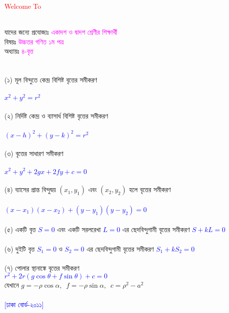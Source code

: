 \documentclass{article}
\begin{document}
 
	\Large
	\textcolor{red}{Welcome To} 
	\\
	\\
	যাদের জন্যে প্রযোজ্যঃ  	\textcolor{magenta}{একাদশ ও দ্বাদশ শ্রেণীর শিক্ষার্থী} \\
	বিষয়ঃ \textcolor{magenta}{উচ্চতর গণিত ১ম পত্র} \\
	অধ্যায়ঃ \textcolor{magenta}{৪-বৃত্ত}\\ 
	\\
	\\
	(১)  মূল বিন্দুতে কেন্দ্র বিশিষ্ট বৃত্তের সমীকরণ  \\
	\\
	\textcolor{blue}{$x^2+y^2=r^2$}\\
	\\
	(২) নির্দিষ্ট কেন্দ্র ও ব্যাসার্ধ বিশিষ্ট বৃত্তের  সমীকরণ \\
	\\
	\textcolor{blue}{$(x-h)^2+(y-k)^2=r^2$}\\
	\\
	(৩) বৃত্তের সাধারণ সমীকরণ\\
	\\  
	\textcolor{blue}{$x^2+y^2+2gx+2fy+c=0$}\\
	\\
	(৪) ব্যাসের প্রান্ত বিন্দুদ্বয় $(x_1,y_1)$ এবং $(x_2,y_2)$ হলে বৃত্তের সমীকরণ\\
	\\ 
	\textcolor{blue}{$(x-x_1)(x-x_2)+(y-y_1)(y-y_2)=0$}\\
	\\
	(৫) একটি বৃত্ত \textcolor{blue}{$S=0$ }এবং একটি সরলরেখা \textcolor{blue}{$L=0$}  এর ছেদবিন্দুগামী বৃত্তের সমীকরণ  \textcolor{blue}{$S+kL=0$} \\
	\\
	(৬) দুইটি বৃত্ত \textcolor{blue}{$S_1=0$} ও \textcolor{blue}{$S_2=0$} এর ছেদবিন্দুগামী বৃত্তের সমীকরণ \textcolor{blue}{$S_1+kS_2=0$}\\  \\
	(৭) পোলার স্থানাঙ্কে বৃত্তের  সমীকরণ \\
	\textcolor{blue}{$r^2+2r(g\cos \theta+f\sin \theta )+c=0$}\\
	যেখানে 	$g=-\rho \cos \alpha,\,\,\,f=-\rho \sin \alpha,\,\,\,c=\rho^2-a^2 $\\
	\\ 
		\textcolor{blue}{[ঢাকা বোর্ড-২০১১]}\\
\end{document}
